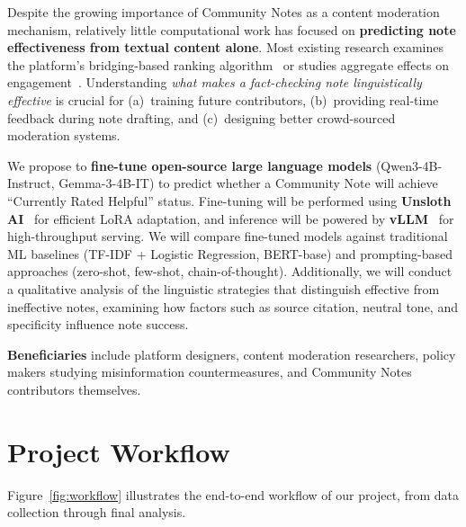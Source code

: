 \documentclass[12pt, a4paper]{article}
\begin{document}
Despite the growing importance of Community Notes as a content moderation mechanism, relatively little computational work has focused on \textbf{predicting note effectiveness from textual content alone}. Most existing research examines the platform's bridging-based ranking algorithm~\cite{allen2022} or studies aggregate effects on engagement~\cite{chuai2024}. Understanding \emph{what makes a fact-checking note linguistically effective} is crucial for (a)~training future contributors, (b)~providing real-time feedback during note drafting, and (c)~designing better crowd-sourced moderation systems.

We propose to \textbf{fine-tune open-source large language models} (Qwen3-4B-Instruct, Gemma-3-4B-IT) to predict whether a Community Note will achieve ``Currently Rated Helpful'' status. Fine-tuning will be performed using \textbf{Unsloth AI}~\cite{unsloth} for efficient LoRA adaptation, and inference will be powered by \textbf{vLLM}~\cite{vllm} for high-throughput serving. We will compare fine-tuned models against traditional ML baselines (TF-IDF + Logistic Regression, BERT-base) and prompting-based approaches (zero-shot, few-shot, chain-of-thought). Additionally, we will conduct a qualitative analysis of the linguistic strategies that distinguish effective from ineffective notes, examining how factors such as source citation, neutral tone, and specificity influence note success.

\textbf{Beneficiaries} include platform designers, content moderation researchers, policy makers studying misinformation countermeasures, and Community Notes contributors themselves.

\section{Project Workflow}

Figure~\ref{fig:workflow} illustrates the end-to-end workflow of our project, from data collection through final analysis.
\end{document}
